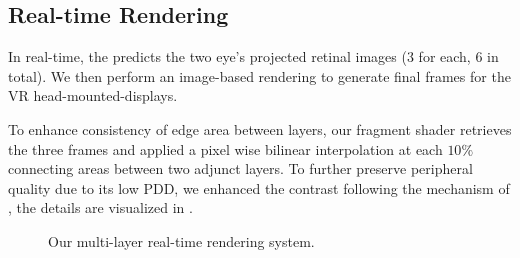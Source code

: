 
\subsection{Real-time Rendering}
\label{sec:method:blending}


In real-time, the \netName predicts the two eye's projected retinal images (3 for each, 6 in total).
We then perform an image-based rendering to generate final frames for the VR head-mounted-displays.

To enhance consistency of edge area between layers, our fragment shader retrieves the three frames and applied a pixel wise bilinear interpolation at each $10\%$ connecting areas between two adjunct layers. To further preserve peripheral quality due to its low PDD, we enhanced the contrast following the mechanism of \cite{Patney:2016:TFR}, the details are visualized in .

\begin{figure}
    \centering

    \caption{Our multi-layer real-time rendering system.}
    \label{fig:method:blending}
\end{figure}


